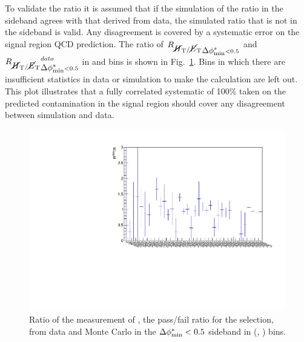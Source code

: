 To validate the ratio \rmhtmet it is assumed that if the simulation of
the ratio in the \bdphi sideband agrees with that derived from data,
the simulated ratio that is not in the sideband is valid. Any
disagreement is covered by a systematic error on the signal region QCD
prediction. The ratio of $\mbox{$R_{\mbox{$\cancel{H}_\text{T}$} / \mbox{$\cancel{E}_\text{T}$}}$}_{\mbox{$\Delta\phi^{*}_{\rm min}$}<0.5}$ and
$\mbox{$R_{\mbox{$\cancel{H}_\text{T}$} / \mbox{$\cancel{E}_\text{T}$}}$}_{\mbox{$\Delta\phi^{*}_{\rm min}$}<0.5}^{data}$ in \scalht and \njet bins is shown in
Fig.~\ref{fig:RR_qcd}. Bins in which there are insufficient statistics
in data or simulation to make the calculation are left out. This plot
illustrates that a fully correlated systematic of 100\% taken on the
predicted \QCD contamination in the signal region should cover any
disagreement between simulation and data.

\begin{figure}[h!]
  \begin{center}        
    \includegraphics[width=\textwidth]{figs/analysis/qcdMethod/doubleQcdSbSrRatio1D}
    \caption{ Ratio of the measurement of \rmhtmet, the pass/fail
    ratio for the \mhtmet selection, from data and Monte Carlo in the
    $\mbox{$\Delta\phi^{*}_{\rm min}$} < 0.5$ sideband in (\scalht, \njet) bins.  }
    \label{fig:RR_qcd}
  \end{center} 
\end{figure}




